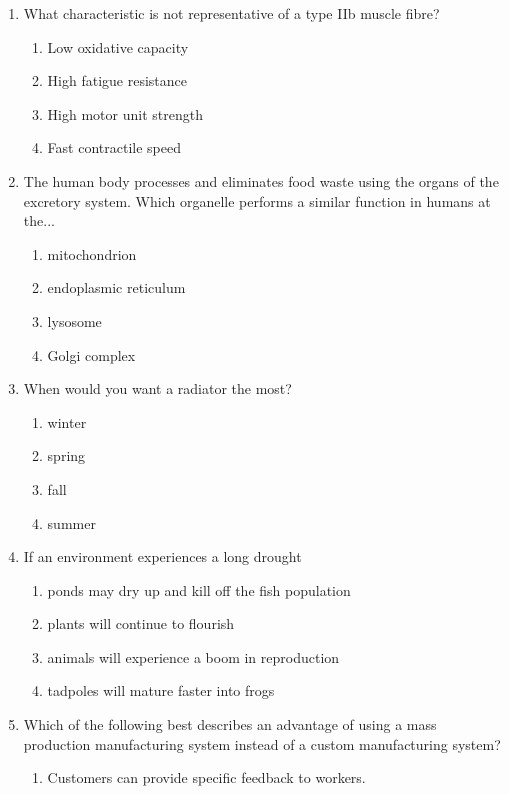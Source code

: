 \documentclass[12pt]{article}
\begin{document}
\begin{enumerate}[label=\arabic*.]
\begin{enumerate}[label=(\alph*)]
    \item volcanic activity occurred when these layers were deposited.
\end{enumerate}
\item What characteristic is not representative of a type IIb muscle fibre?
\begin{enumerate}[label=(\alph*)]
    \item Low oxidative capacity
    \item High fatigue resistance
    \item High motor unit strength
    \item Fast contractile speed
\end{enumerate}
\item The human body processes and eliminates food waste using the organs of the excretory system. Which organelle performs a similar function in humans at the...
\begin{enumerate}[label=(\alph*)]
    \item mitochondrion
    \item endoplasmic reticulum
    \item lysosome
    \item Golgi complex
\end{enumerate}
\item When would you want a radiator the most?
\begin{enumerate}[label=(\alph*)]
    \item winter
    \item spring
    \item fall
    \item summer
\end{enumerate}
\item If an environment experiences a long drought
\begin{enumerate}[label=(\alph*)]
    \item ponds may dry up and kill off the fish population
    \item plants will continue to flourish
    \item animals will experience a boom in reproduction
    \item tadpoles will mature faster into frogs
\end{enumerate}
\item Which of the following best describes an advantage of using a mass production manufacturing system instead of a custom manufacturing system?
\begin{enumerate}[label=(\alph*)]
    \item Customers can provide specific feedback to workers.

\end{enumerate}
\end{enumerate}
\end{document}
